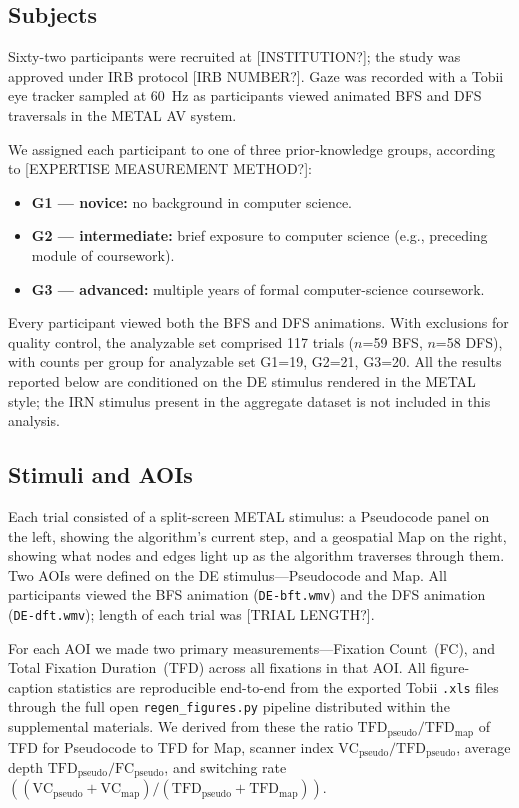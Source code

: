 \documentclass[journal]{vgtc}
\begin{document}
\subsection{Subjects}
\label{sec:subjects}

Sixty-two participants were recruited at [INSTITUTION?]; the
study was approved under IRB protocol [IRB NUMBER?]. Gaze was
recorded with a Tobii eye tracker sampled at 60~Hz as participants
viewed animated BFS and DFS traversals in the METAL AV system.

We assigned each participant to one of three prior-knowledge groups,
according to [EXPERTISE MEASUREMENT METHOD?]:
\begin{itemize}
  \item \textbf{G1 --- novice:} no background in computer science.
  \item \textbf{G2 --- intermediate:} brief exposure to computer
    science (e.g., preceding module of coursework).
  \item \textbf{G3 --- advanced:} multiple years of formal
    computer-science coursework.
\end{itemize}

Every participant viewed both the BFS and DFS animations. With
exclusions for quality control, the analyzable set comprised 117
trials ($n$=59 BFS, $n$=58 DFS), with counts per group for analyzable
set G1=19, G2=21, G3=20. All the results reported below are
conditioned on the DE stimulus rendered in the METAL style; the IRN
stimulus present in the aggregate dataset is not included in this
analysis.

\subsection{Stimuli and AOIs}
\label{sec:stimuli}

Each trial consisted of a split-screen METAL stimulus: a Pseudocode
panel on the left, showing the algorithm's current step, and a
geospatial Map on the right, showing what nodes and edges light up as
the algorithm traverses through them. Two AOIs were defined on the DE
stimulus---Pseudocode and Map. All participants viewed the BFS
animation (\texttt{DE-bft.wmv}) and the DFS animation
(\texttt{DE-dft.wmv}); length of each trial was [TRIAL LENGTH?].

For each AOI we made two primary measurements---Fixation Count~(FC),
and Total Fixation Duration~(TFD) across all fixations in that AOI.
All figure-caption statistics are reproducible end-to-end from the
exported Tobii \texttt{.xls} files through the full open
\texttt{regen\_figures.py} pipeline distributed within the
supplemental materials.
We derived from these the ratio
$\text{TFD}_\text{pseudo}/\text{TFD}_\text{map}$ of TFD for Pseudocode
to TFD for Map, scanner index
$\text{VC}_\text{pseudo}/\text{TFD}_\text{pseudo}$, average depth
$\text{TFD}_\text{pseudo}/\text{FC}_\text{pseudo}$, and switching
rate
$((\text{VC}_\text{pseudo}+\text{VC}_\text{map})/
(\text{TFD}_\text{pseudo}+\text{TFD}_\text{map}))$.
\end{document}
